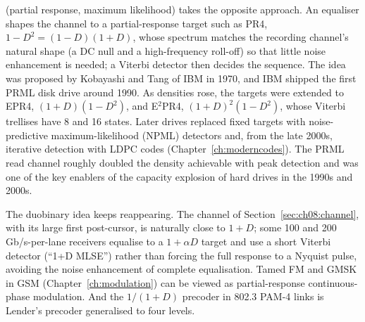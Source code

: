 
 (partial response, maximum likelihood) takes the opposite approach. An equaliser
shapes the channel to a partial-response target such as PR4, $1-D^2=(1-D)(1+D)$, whose
spectrum matches the recording channel's natural shape (a DC null and a high-frequency
roll-off) so that little noise enhancement is needed; a Viterbi detector then decides the
sequence. The idea was proposed by Kobayashi and Tang of IBM in 1970, and IBM shipped the first
PRML disk drive around 1990. As densities rose, the targets were extended to EPR4,
$(1+D)(1-D^2)$, and E$^2$PR4, $(1+D)^2(1-D^2)$, whose Viterbi trellises have 8 and 16 states.
Later drives replaced fixed targets with noise-predictive maximum-likelihood (NPML) detectors
and, from the late 2000s, iterative detection with LDPC codes (Chapter~\ref{ch:moderncodes}). The
PRML read channel roughly doubled the density achievable with peak detection and was one of
the key enablers of the capacity explosion of hard drives in the 1990s and 2000s.


\begin{inpractice}
The duobinary idea keeps reappearing. The channel of Section~\ref{sec:ch08:channel}, with its
large first post-cursor, is naturally close to $1+D$; some 100 and 200\,Gb/s-per-lane
receivers equalise to a $1+\alpha D$ target and use a short Viterbi detector (``1+D MLSE'') rather
than forcing the full response to a Nyquist pulse, avoiding the noise enhancement of complete
equalisation. Tamed FM and GMSK in GSM (Chapter~\ref{ch:modulation}) can be viewed as
partial-response continuous-phase modulation. And the $1/(1+D)$ precoder in 802.3 PAM-4 links
is Lender's precoder generalised to four levels.
\end{inpractice}


